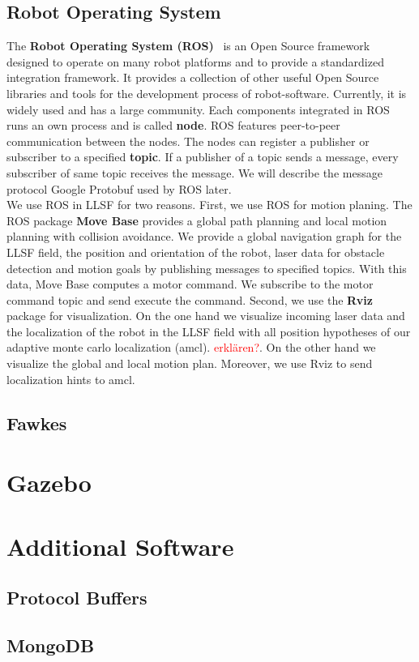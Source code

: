 \subsection{Robot Operating System}
The \textbf{Robot Operating System (ROS)}~\cite{Ros} is an Open Source framework designed to operate on many robot platforms and to provide a standardized integration framework. It provides a collection of other useful Open Source libraries and tools for the development process of robot-software. Currently, it is widely used and has a large community. Each components integrated in ROS runs an own process and is called \textbf{node}. ROS features peer-to-peer communication between the nodes. The nodes can register a publisher or subscriber to a specified \textbf{topic}. If a publisher of a topic sends a message, every subscriber of same topic receives the message. We will describe the message protocol Google Protobuf used by ROS later.\\
We use ROS in LLSF for two reasons. First, we use ROS for motion planing. The ROS package \textbf{Move Base} provides a global path planning and local motion planning with collision avoidance. We provide a global navigation graph for the LLSF field, the position and orientation of the robot, laser data for obstacle detection and motion goals by publishing messages to specified topics. With this data, Move Base computes a motor command. We subscribe to the motor command topic and send execute the command. Second, we use the \textbf{Rviz} package for visualization. On the one hand we visualize incoming laser data and the localization of the robot in the LLSF field with all position hypotheses of our adaptive monte carlo localization (amcl). \textcolor{red}{erklären?}. On the other hand we visualize the global and local motion plan. Moreover, we use Rviz to send localization hints to amcl.

\subsection{Fawkes}
\section{Gazebo}
\section{Additional Software}
\subsection{Protocol Buffers}
\subsection{MongoDB}
